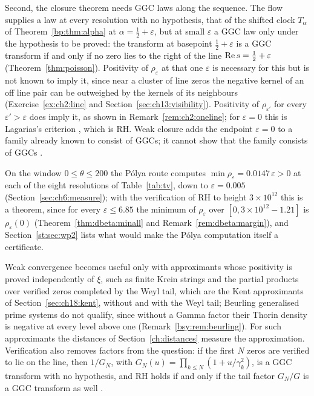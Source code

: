 Second, the closure theorem needs GGC laws along the sequence. The flow supplies a law at every resolution with no hypothesis, that of the shifted clock $T_\alpha$ of Theorem~\ref{bp:thm:alpha} at $\alpha=\tfrac12+\varepsilon$, but at small $\varepsilon$ a GGC law only under the hypothesis to be proved: the transform at basepoint $\tfrac12+\varepsilon$ is a GGC transform if and only if no zero lies to the right of the line $\operatorname{Re} s=\tfrac12+\varepsilon$ (Theorem~\ref{thm:poisson}). Positivity of $\rho_\varepsilon$ at that one $\varepsilon$ is necessary for this but is not known to imply it, since near a cluster of line zeros the negative kernel of an off line pair can be outweighed by the kernels of its neighbours (Exercise~\ref{ex:ch2:line} and Section~\ref{sec:ch13:visibility}). Positivity of $\rho_{\varepsilon'}$ for every $\varepsilon'>\varepsilon$ does imply it, as shown in Remark~\ref{rem:ch2:oneline}; for $\varepsilon=0$ this is Lagarias's criterion \cite{Lagarias}, which is RH. Weak closure adds the endpoint $\varepsilon=0$ to a family already known to consist of GGCs; it cannot show that the family consists of GGCs \cite[Remark 3.10]{P26}.

On the window $0\le\theta\le200$ the P\'olya route computes $\min\rho_\varepsilon=0.0147\,\varepsilon>0$ at each of the eight resolutions of Table~\ref{tab:tv}, down to $\varepsilon=0.005$ (Section~\ref{sec:ch6:measure}); with the verification of RH to height $3\times10^{12}$ this is a theorem, since for every $\varepsilon\le6.85$ the minimum of $\rho_\varepsilon$ over $[0,3\times10^{12}-1.21]$ is $\rho_\varepsilon(0)$ (Theorem~\ref{thm:dbeta:minall} and Remark~\ref{rem:dbeta:margin}), and Section~\ref{st:sec:wp2} lists what would make the P\'olya computation itself a certificate.

Weak convergence becomes useful only with approximants whose positivity is proved independently of $\xi$, such as finite Krein strings and the partial products over verified zeros completed by the Weyl tail, which are the Kent approximants of Section~\ref{sec:ch18:kent}, without and with the Weyl tail; Beurling generalised prime systems do not qualify, since without a Gamma factor their Thorin density is negative at every level above one (Remark~\ref{bsy:rem:beurling}). For such approximants the distances of Section~\ref{ch:distances} measure the approximation. Verification also removes factors from the question: if the first $N$ zeros are verified to lie on the line, then $1/G_N$, with $G_N(u)=\prod_{k\le N}(1+u/\gamma_k^2)$, is a GGC transform with no hypothesis, and RH holds if and only if the tail factor $G_N/G$ is a GGC transform as well \cite[Corollary 18.11]{P26}.


